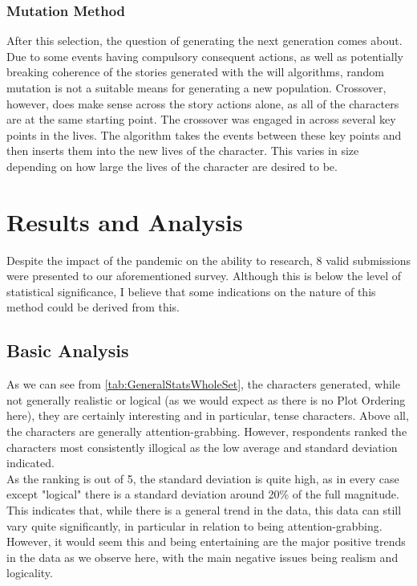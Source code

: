 \documentclass[12pt]{article}
\begin{document}
\subsubsection{Mutation Method}
After this selection, the question of generating the next generation comes about. Due to some events having compulsory consequent actions, as well as potentially breaking coherence of the stories generated with the will algorithms, random mutation is not a suitable means for generating a new population. Crossover, however, does make sense across the story actions alone, as all of the characters are at the same starting point. The crossover was engaged in across several key points in the lives. The algorithm takes the events between these key points and then inserts them into the new lives of the character. This varies in size depending on how large the lives of the character are desired to be. 


\section{Results and Analysis}
Despite the impact of the pandemic on the ability to research, 8 valid submissions were presented to our aforementioned survey. Although this is below the level of statistical significance, I believe that some indications on the nature of this method could be derived from this. 

\subsection{Basic Analysis}
As we can see from \ref{tab:GeneralStatsWholeSet}, the characters generated, while not generally realistic or logical (as we would expect as there is no Plot Ordering here), they are certainly interesting and in particular, tense characters. Above all, the characters are generally attention-grabbing. However, respondents ranked the characters most consistently illogical as the low average and standard deviation indicated.   \\

As the ranking is out of 5, the standard deviation is quite high, as in every case except "logical" there is a standard deviation around 20\% of the full magnitude. This indicates that, while there is a general trend in the data, this data can still vary quite significantly, in particular in relation to being attention-grabbing. However, it would seem this and being entertaining are the major positive trends in the data as we observe here, with the main negative issues being realism and logicality. \\
\end{document}
